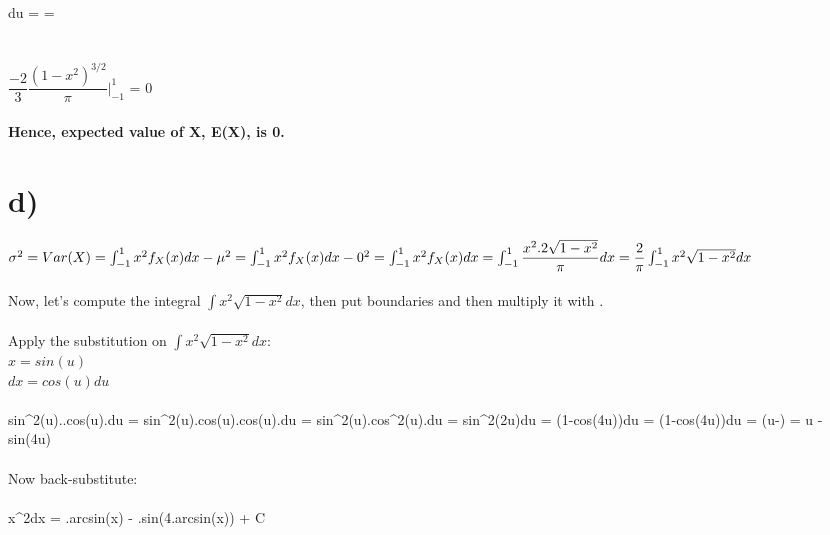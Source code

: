 \documentclass[11pt]{article}
\begin{document}
\noindent \int {}du =  =  \\

\noindent {} \\ \\
$\dfrac{-2}{3} \dfrac{(1-x^2)^{3/2}}{\pi}\big|_{-1}^{1}$  = 0 \\\\

\noindent \textbf{Hence, expected value of X, E(X), is \textbf{0}.}\newpage

\section*{d)}
$\sigma^2 = Var(X) = \int_{-1}^{1}x^2f_X(x)dx - \mu^2 = \int_{-1}^{1}x^2f_X(x)dx -0^2 = \int_{-1}^{1}x^2f_X(x)dx = \int_{-1}^{1}\dfrac{x^2.2\sqrt{1-x^2}}{\pi} dx \\ =\dfrac{2}{\pi} \int_{-1}^{1}  x^2\sqrt{1-x^2} dx$ \\ \\

\noindent Now, let's compute the integral $\int x^2\sqrt{1-x^2}dx$, then put boundaries and then multiply it with  .  \\ \\

\noindent Apply the substitution on $\int x^2\sqrt{1-x^2}dx$\space:  \\ 

\noindent $x = sin(u)$ \\
$dx = cos(u)du$ \\ \\

\noindent \int sin^2(u)..cos(u).du = \int sin^2(u).cos(u).cos(u).du = \int sin^2(u).cos^2(u).du = \int sin^2(2u)du \newline = \int {}(1-cos(4u))du = \int (1-cos(4u))du = 
(u-) = u - sin(4u) \\ \\

\noindent Now back-substitute: \\ \\
\int x^2dx = .arcsin(x) - .sin(4.arcsin(x)) + C \\ \\
\end{document}
